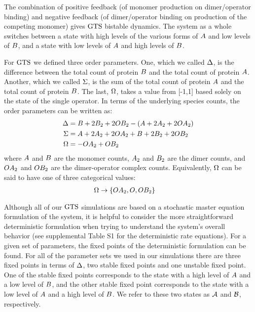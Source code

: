 The combination of positive feedback (of monomer production on dimer/operator binding) and negative feedback (of dimer/operator binding on production of the competing monomer) gives $\text{GTS}$ bistable dynamics\supercite{Biancalani:2015ii}. The system as a whole switches between a state with high levels of the various forms of $A$ and low levels of $B$, and a state with low levels of $A$ and high levels of $B$.

For $\text{GTS}$ we defined three order parameters. One, which we called $\Delta$, is the difference between the total count of protein $B$ and the total count of protein $A$. Another, which we called $\Sigma$, is the sum of the total count of protein $A$ and the total count of protein $B$. The last, $\Omega$, takes a value from [-1,1] based solely on the state of the single operator. In terms of the underlying species counts, the order parameters can be written as:
\begin{align*}
    \Delta &= B + 2B_2 + 2OB_2 - \left( A + 2A_2 + 2OA_2 \right) \\
    \Sigma &= A + 2A_2 + 2OA_2 + B + 2B_2 + 2OB_2 \\
    \Omega &= -OA_2 + OB_2
\end{align*}
where $A$ and $B$ are the monomer counts, $A_2$ and $B_2$ are the dimer counts, and $OA_2$ and $OB_2$ are the dimer-operator complex counts. Equivalently, $\Omega$ can be said to have one of three categorical values:
    \begin{align*}
        \Omega &\rightarrow \{OA_2, O, OB_2\}
    \end{align*}

Although all of our $\text{GTS}$ simulations are based on a stochastic master equation formulation of the system, it is helpful to consider the more straightforward deterministic formulation when trying to understand the system's overall behavior (see supplemental Table S1 for the deterministic rate equations). For a given set of parameters, the fixed points of the deterministic formulation can be found. For all of the parameter sets we used in our simulations there are three fixed points in terms of $\Delta$, two stable fixed points and one unstable fixed point. One of the stable fixed points corresponds to the state with a high level of $A$ and a low level of $B$, and the other stable fixed point corresponds to the state with a low level of $A$ and a high level of $B$. We refer to these two states as $\mathcal{A}$ and $\mathcal{B}$, respectively.

